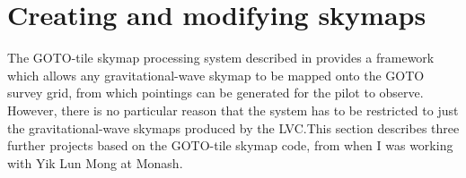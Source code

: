 
\section{Creating and modifying skymaps}
\label{sec:custom_skymaps}


\begin{colsection}

The GOTO-tile skymap processing system described in  provides a framework which allows any gravitational-wave skymap to be mapped onto the GOTO survey grid, from which pointings can be generated for the pilot to observe. However, there is no particular reason that the system has to be restricted to just the gravitational-wave skymaps produced by the LVC.\@ This section describes three further projects based on the GOTO-tile skymap code, from when I was working with Yik Lun Mong at Monash.

\end{colsection}


